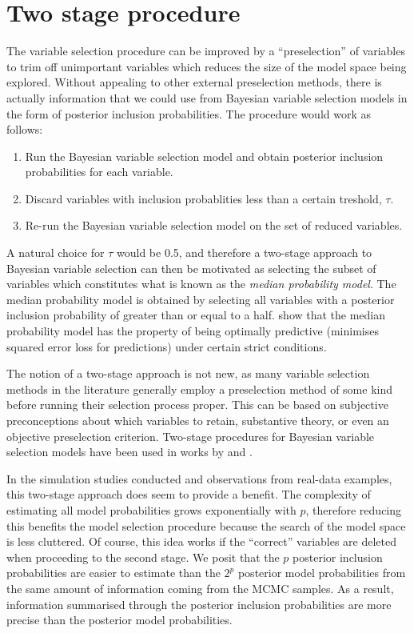 \documentclass[11pt,twoside,openright]{report}
\begin{document}
\section{Two stage procedure}

The variable selection procedure can be improved by a ``preselection'' of variables to trim off unimportant variables which reduces the size of the model space being explored.
Without appealing to other external preselection methods, there is actually information that we could use from Bayesian variable selection models in the form of posterior inclusion probabilities.
The procedure would work as follows:

\begin{enumerate}
  \item Run the Bayesian variable selection model and obtain posterior inclusion probabilities for each variable.
  \item Discard variables with inclusion probablities less than a certain treshold, $\tau$.
  \item Re-run the Bayesian variable selection model on the set of reduced variables.
\end{enumerate}

A natural choice for $\tau$ would be 0.5, and therefore a two-stage approach to Bayesian variable selection can then be motivated as selecting the subset of variables which constitutes what is known as the \emph{median probability model}.
The median probability model is obtained by selecting all variables with a posterior inclusion probability of greater than or equal to a half.
\citet{Barbieri2004} show that the median probability model has the property of being optimally predictive (minimises squared error loss for predictions) under certain strict conditions. 

The notion of a two-stage approach is not new, as many variable selection methods in the literature generally employ a preselection method of some kind before running their selection process proper.
This can be based on subjective preconceptions about which variables to retain, substantive theory, or even an objective preselection criterion.
Two-stage procedures for Bayesian variable selection models have been used in works by \citet{Fouskakis2008} and \citet{Ntzoufras2008}. 

In the simulation studies conducted and observations from real-data examples, this two-stage approach does seem to provide a benefit.
The complexity of estimating all model probabilities grows exponentially with $p$, therefore reducing this benefits the model selection procedure because the search of the model space is less cluttered.
Of course, this idea works if the ``correct'' variables are deleted when proceeding to the second stage.
We posit that the $p$ posterior inclusion probabilities are easier to estimate than the $2^p$ posterior model probabilities from the same amount of information coming from the MCMC samples.
As a result, information summarised through the posterior inclusion probabilities are more precise than the posterior model probabilities.
\end{document}
